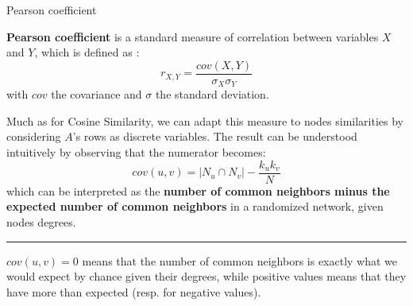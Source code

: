 \begin{textbox}{Pearson coefficient }

\textbf{Pearson coefficient} is a standard measure of correlation between variables $X$ and $Y$, which is defined as :
\[
r_{X,Y}=\frac{cov(X,Y)}{\sigma_X \sigma_Y}
\]
with $cov$ the covariance and $\sigma$ the standard deviation.

Much as for Cosine Similarity, we can adapt this measure to nodes similarities by considering $A$'s rows as discrete variables. The result can be understood intuitively by observing that the numerator becomes:
\[
cov(u,v)=|N_u \cap N_v|- \frac{k_u k_v}{N}
\]
which can be interpreted as the \textbf{number of common neighbors minus the expected number of common neighbors} in a randomized network, given nodes degrees.

\noindent\rule{4cm}{0.1pt}

$cov(u,v)=0$ means that the number of common neighbors is exactly what we would expect by chance given their degrees, while positive values means that they have more than expected (resp. for negative values).

\end{textbox}